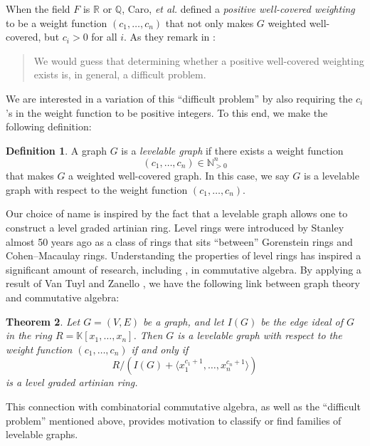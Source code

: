 \documentclass[12pt]{amsart}
\numberwithin{equation}{section}
\newtheorem{theorem}{Theorem}[section]
\theoremstyle{definition}
\newtheorem{definition}[theorem]{Definition}
\newcounter{i} %
\begin{document}
When the field $F$ is $\mathbb{R}$ or $\mathbb{Q}$,
Caro, {\it et al.} \cite{CER1998} defined a {\it positive well-covered weighting} to be a weight function $(c_1,\ldots,c_n)$ 
that not only makes $G$ weighted well-covered, but $c_i > 0$
for all $i$.  As they remark in \cite[p. 653]{CER1998}:
\begin{quote}
We would guess that determining whether a positive
well-covered weighting exists is, in general, a difficult problem.
\end{quote}
We are interested in a variation of this 
``difficult problem'' by also requiring the $c_i$'s in the
weight function to
be positive integers. To this end, we make the following
definition:

\begin{definition}\label{defn.levelable}
A graph  $G$ is a {\it levelable graph} if there exists a 
weight function \[(c_1,\ldots,c_n) \in \mathbb{N}^n_{>0}\]
that makes $G$ a weighted well-covered graph.  In this
case, we say $G$ is a levelable graph with respect
to the weight function $(c_1,\ldots,c_n)$.  
\end{definition}

Our choice of name is inspired by the fact that a levelable
graph allows one to construct a level graded artinian ring.
Level rings were introduced by Stanley \cite{Stan77}
almost 50 years ago as a class of rings that sits 
``between'' Gorenstein rings and Cohen--Macaulay
rings. Understanding the properties of level rings has inspired
a significant amount of research, including 
\cite{GHMS2007,HSZ, HLO, HH06, H88, H89, H92, MNZ},
in commutative algebra.  
By applying a result of Van Tuyl and Zanello \cite{VTZ2010}, 
we have the  following link between graph theory 
and commutative algebra:

\begin{theorem}\label{maintheorem}
    Let $G = (V,E)$ be a graph,  and let $I(G)$ be the edge ideal of
    $G$ in the ring $R = \mathbb{K}[x_1,\ldots,x_n]$.  Then
    $G$ is a levelable graph with respect to the
    weight function $(c_1,\ldots,c_n)$ if and only if
    \[R/(I(G)+\langle x_1^{c_1+1},\ldots,x_n^{c_n+1}\rangle)\]
    is a level graded artinian ring.
\end{theorem}

\noindent
This connection with combinatorial commutative algebra,
as well as the ``difficult problem'' mentioned above, provides
motivation to classify or find families of levelable graphs.  
\end{document}
